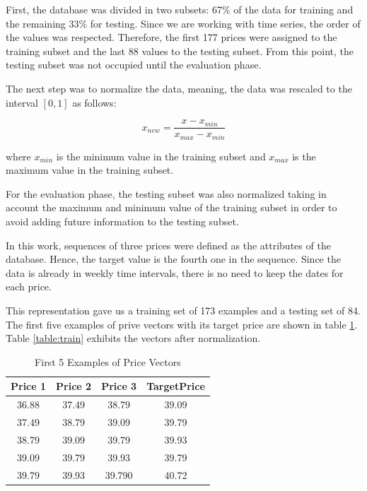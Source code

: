 First, the database was divided in two subsets: 67\% of the data for training and the remaining 33\% for testing. Since we are working with time series, the order of the values was respected. Therefore, the first 177 prices were assigned to the training subset and the last 88 values to the testing subset. From this point, the testing subset was not occupied until the evaluation phase.

The next step was to normalize the data, meaning, the data was rescaled to the interval $[0,1]$ as follows:

\begin{equation}
\label{eq:normalize}
x_{new}=\frac{x-x_{min}}{x_{max}-x_{min}}
\end{equation}

where $x_{min}$ is the minimum value in the training subset and $x_{max}$ is the maximum value in the training subset. 

For the evaluation phase, the testing subset was also normalized taking in account the maximum and minimum value of the training subset in order to avoid adding future information to the testing subset.

In this work, sequences of three prices were defined as the attributes of the database. Hence, the target value is the fourth one in the sequence. Since the data is already in weekly time intervals, there is no need to keep the dates for each price.

This representation gave us a training set of 173 examples and a testing set of 84. The first five examples of prive vectors with its target price are shown in table \ref{table:trainPrices}. Table \ref{table:train} exhibits the vectors after normalization.


\begin{table}{}
\begin{center}
\begin{tabular}{ c | c | c | c }
    \hline
     \textbf{Price 1} &  \textbf{Price 2} &    \textbf{Price 3} &   \textbf{TargetPrice}\\ \hline
    36.88&  37.49&  38.79 &39.09\\ \hline
    37.49&  38.79&  39.09&39.79\\ \hline
    38.79&  39.09&  39.79&39.93\\ \hline
   39.09&  39.79&  39.93&39.79\\ \hline
    39.79&  39.93&  39.790&40.72\\ \hline
    \hline
  \end{tabular}
\caption{First 5 Examples of Price Vectors}
 \label{table:trainPrices}
\end{center}

 \end{table}


